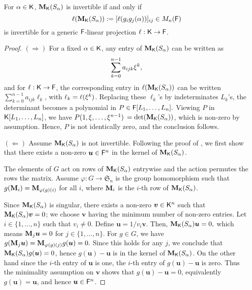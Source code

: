 \begin{lemma}
  \label{Lem:Proj}
  For $\alpha \in {\mathsf{K}}$, $\mat M_\K(S_\alpha)$ is invertible if and only
  if $$\ell(\mat M_\K(S_\alpha)) := [\ell(g_ig_j(\alpha))]_{ij} \in M_n(\F)$$
  is invertible for a generic ${\mathsf{F}}$-linear projection $\ell: {\mathsf{K}} \to {\mathsf{F}}$.
\end{lemma}
\begin{proof}
  $(\Rightarrow)$ For a fixed $\alpha\in{\mathsf{K}}$, any entry of
  $\mat M_\K(S_\alpha)$ can be written as
  \begin{equation}\label{Eq:PrimElm}
    \sum_{k= 0}^{n-1} a_{ijk}\xi^k,
  \end{equation}
  and for $\ell: {\mathsf{K}} \to {\mathsf{F}}$, the corresponding entry in $\ell(\mat
  M_\K(S_\alpha))$ can be written $\sum_{k= 0}^{n-1} a_{ijk}\ell_k$, with
  $\ell_k = \ell(\xi^k)$. Replacing these $\ell_k$'s by
  indeterminates $L_k$'s, the determinant becomes a polynomial in $P
  \in {\mathsf{F}}[L_1, \ldots, L_n].$ Viewing $P$ in ${\mathsf{K}}[L_1, \ldots, L_n]$, we
  have $ P(1, \xi, \ldots, \xi^{n-1})$ $= \det(\mat M_\K(S_\alpha))$,
  which is non-zero by assumption. Hence, $P$ is not identically zero,
  and the conclusion follows.
  
  $(\Leftarrow)$ Assume $\mat M_\K(S_\alpha)$ is not invertible. Following the
  proof of \citet[Lemma 4]{Jam18}, we first show that there exists a
  non-zero $\boldsymbol{u} \in {\mathsf{F}}^n$ in the kernel of $\mat M_\K(S_\alpha)$.
  
  The elements of $G$ act on rows of $\mat M_\K(S_\alpha)$ entrywise and the
  action permutes the rows the matrix. Assume
  $\varphi : G \to \mathfrak{S}_n$ is the group homomorphism such that
  $g(\mat M_i) = \mat M_{\varphi(g)(i)}$ for all $i$, where $\mat M_i$ is
  the $i$-th row of $\mat M_\K(S_\alpha)$.
  
  Since $\mat M_\K(S_\alpha)$ is singular, there exists a non-zero
  $\boldsymbol{v} \in {\mathsf{K}}^n$ such that $\mat M_\K(S_\alpha)\boldsymbol{v} = 0$;
  we choose $\boldsymbol{v}$ having the minimum number of non-zero
  entries. Let $i \in \lbrace 1, \ldots , n \rbrace$ such that
  $v_i \neq 0$. Define $\boldsymbol{u} = 1/v_i\boldsymbol{v}$. Then,
  $\mat M_\K(S_\alpha)\boldsymbol{u} = 0,$ which means
  $\mat M_j \boldsymbol{u} = 0 $ for $j \in \lbrace 1, \ldots, n
  \rbrace$. For $g \in G$, we have
  $g(\mat M_j \boldsymbol{u}) = \mat M_{\varphi(g)(j)} g(\boldsymbol{u})=
  0.$ Since this holds for any $j$, we conclude that
  $\mat M_\K(S_\alpha)g(\boldsymbol{u})= 0$, hence
  $g(\boldsymbol{u})-\boldsymbol{u}$ is in the kernel of
  $\mat M_\K(S_\alpha)$. On the other hand since the $i$-th entry of
  $\boldsymbol{u}$ is one, the $i$-th entry of
  $g(\boldsymbol{u}) -\boldsymbol{u}$ is zero. Thus the minimality
  assumption on $\textbf{v}$ shows that
  $g(\boldsymbol{u}) -\boldsymbol{u} = 0$, equivalently
  $g(\boldsymbol{u})=\boldsymbol{u}$, and hence $\boldsymbol{u} \in {\mathsf{F}}^n$.
  

\end{proof}
